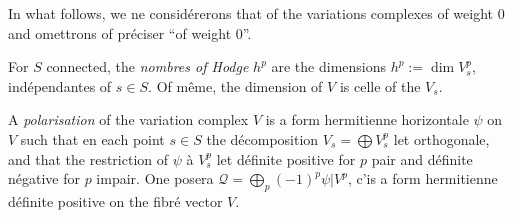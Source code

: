 \documentclass[12pt,a4paper]{article}
\theoremstyle{plain}
\theoremstyle{definition}
\begin{document}
In what follows, we ne consid\'{e}rerons that of the variations complexes of weight $0$ and omettrons of pr\'{e}ciser ``of weight $0$''.

For $S$ connected, the \emph{nombres of Hodge} $h^{p}$ are the dimensions $h^{p} := \dim V_{s}^{p}$, ind\'{e}pendantes of $s \in S$. Of m\^{e}me, the dimension of $V$ is celle of the $V_{s}$.

A \emph{polarisation} of the variation complex $V$ is a form hermitienne horizontale $\psi$ on $V$ such that en each point $s \in S$ the d\'{e}composition $V_{s} = \bigoplus V_{s}^{p}$ let orthogonale, and that the restriction of $\psi$ \`{a} $V_{s}^{p}$ let d\'{e}finite positive for $p$ pair and d\'{e}finite n\'{e}gative for $p$ impair. One posera $\mathcal{Q} = \bigoplus_{p} (-1)^{p} \psi|V^{p}$, c'is a form hermitienne d\'{e}finite positive on the fibr\'{e} vector $V$.
\end{document}
